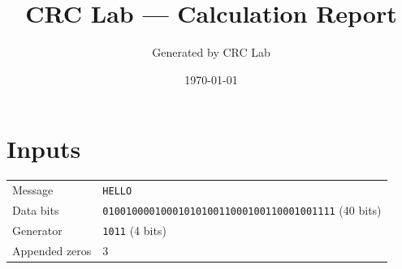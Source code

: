 \documentclass[11pt,a4paper]{article}
\title{CRC Lab --- Calculation Report}
\author{Generated by CRC Lab}
\date{\today}
\begin{document}
\maketitle

\section{Inputs}
\begin{tabular}{ll}
\toprule
Message & \texttt{HELLO} \\
Data bits & \texttt{0100100001000101010011000100110001001111} (40 bits) \\
Generator & \texttt{1011} (4 bits) \\
Appended zeros & 3 \\
\bottomrule
\end{tabular}
\end{document}

